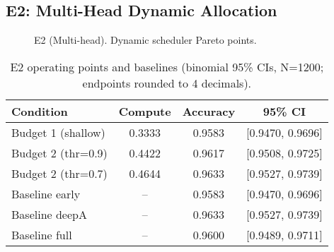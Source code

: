 \subsection{E2: Multi-Head Dynamic Allocation}
\begin{figure}[H]
  \centering
  \begin{adjustbox}{width=\linewidth}
  \end{adjustbox}
  \caption{E2 (Multi-head). Dynamic scheduler Pareto points.}
  \label{fig:e2}
\end{figure}

\begin{table}[H]
  \centering
  \caption{E2 operating points and baselines (binomial 95\% CIs, N=1200; endpoints rounded to 4 decimals).}
  \vspace{0.25em}
  \begin{adjustbox}{width=\linewidth}
  \begin{tabular}{l c c c}
    \toprule
    Condition & Compute & Accuracy & 95\% CI \\
    \midrule
    Budget 1 (shallow) & 0.3333 & 0.9583 & [0.9470, 0.9696] \\
    Budget 2 (thr=0.9) & 0.4422 & 0.9617 & [0.9508, 0.9725] \\
    Budget 2 (thr=0.7) & 0.4644 & 0.9633 & [0.9527, 0.9739] \\
    \midrule
    Baseline early & -- & 0.9583 & [0.9470, 0.9696] \\
    Baseline deepA & -- & 0.9633 & [0.9527, 0.9739] \\
    Baseline full  & -- & 0.9600 & [0.9489, 0.9711] \\
    \bottomrule
  \end{tabular}
  \end{adjustbox}
\end{table}

